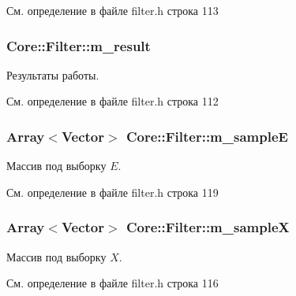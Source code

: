 См. определение в файле filter.\+h строка 113

\subsubsection[{\texorpdfstring{m\+\_\+result}{m_result}}]{ Core\+::\+Filter\+::m\+\_\+result\hspace{0.3cm}{\ttfamily [protected]}}\hypertarget{class_core_1_1_filter_a1ae638614492df7edeaa2db4f528ad65}{}\label{class_core_1_1_filter_a1ae638614492df7edeaa2db4f528ad65}
Результаты работы. 

См. определение в файле filter.\+h строка 112

\subsubsection[{\texorpdfstring{m\+\_\+sampleE}{m_sampleE}}]{\setlength{\rightskip}{0pt plus 5cm}Array$<$Vector$>$ Core\+::\+Filter\+::m\+\_\+sampleE\hspace{0.3cm}{\ttfamily [protected]}}\hypertarget{class_core_1_1_filter_acab6dcadb8caf8f05cb2beeb1deafd74}{}\label{class_core_1_1_filter_acab6dcadb8caf8f05cb2beeb1deafd74}
Массив под выборку $E$. 

См. определение в файле filter.\+h строка 119

\subsubsection[{\texorpdfstring{m\+\_\+sampleX}{m_sampleX}}]{\setlength{\rightskip}{0pt plus 5cm}Array$<$Vector$>$ Core\+::\+Filter\+::m\+\_\+sampleX\hspace{0.3cm}{\ttfamily [protected]}}\hypertarget{class_core_1_1_filter_abed73a8bfce99d24418f6dee90c44333}{}\label{class_core_1_1_filter_abed73a8bfce99d24418f6dee90c44333}
Массив под выборку $X$. 

См. определение в файле filter.\+h строка 116

